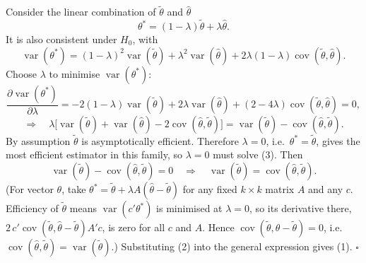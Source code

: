 \documentclass[11pt]{article}
\begin{document}
Consider the linear combination of $\tilde\theta$ and $\hat\theta$
\[ \theta^{*}=(1-\lambda)\tilde\theta+\lambda\hat\theta . \]
It is also consistent under $H_{0}$, with
\[ \operatorname{var}(\theta^{*})=(1-\lambda)^{2}\operatorname{var}(\tilde\theta)+\lambda^{2}\operatorname{var}(\hat\theta)
   +2\lambda(1-\lambda)\operatorname{cov}(\tilde\theta,\hat\theta). \]
Choose $\lambda$ to minimise $\operatorname{var}(\theta^{*})$:
\[ \frac{\partial\operatorname{var}(\theta^{*})}{\partial\lambda}
   =-2(1-\lambda)\operatorname{var}(\tilde\theta)+2\lambda\operatorname{var}(\hat\theta)+(2-4\lambda)\operatorname{cov}(\tilde\theta,\hat\theta)=0, \]
\begin{equation}\tag{3}
 \Longrightarrow\quad
 \lambda\bigl[\operatorname{var}(\tilde\theta)+\operatorname{var}(\hat\theta)-2\operatorname{cov}(\hat\theta,\tilde\theta)\bigr]
 =\operatorname{var}(\tilde\theta)-\operatorname{cov}(\hat\theta,\tilde\theta).
\end{equation}
By assumption $\tilde\theta$ is asymptotically efficient. Therefore $\lambda=0$, i.e.\ $\theta^{*}=\tilde\theta$,
gives the most efficient estimator in this family, so $\lambda=0$ must solve (3). Then
\[ \operatorname{var}(\tilde\theta)-\operatorname{cov}(\hat\theta,\tilde\theta)=0
   \quad\Longrightarrow\quad\operatorname{var}(\tilde\theta)=\operatorname{cov}(\hat\theta,\tilde\theta). \]
(For vector $\theta$, take $\theta^{*}=\tilde\theta+\lambda A(\hat\theta-\tilde\theta)$ for any fixed $k\times k$ matrix $A$
and any $c$. Efficiency of $\tilde\theta$ means $\operatorname{var}(c'\theta^{*})$ is minimised at $\lambda=0$, so its
derivative there, $2\,c'\operatorname{cov}(\tilde\theta,\hat\theta-\tilde\theta)A'c$, is zero for all $c$ and $A$. Hence
$\operatorname{cov}(\tilde\theta,\hat\theta-\tilde\theta)=0$, i.e.\ $\operatorname{cov}(\hat\theta,\tilde\theta)=\operatorname{var}(\tilde\theta)$.) Substituting (2) into the
general expression gives (1). \hfill$\square$
\end{document}
